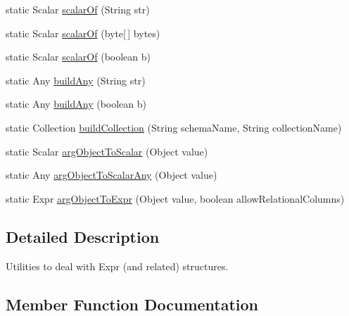 \begin{DoxyCompactItemize}
\item 
static Scalar \mbox{\hyperlink{classcom_1_1mysql_1_1cj_1_1xdevapi_1_1_expr_util_acd10bb6f827786d7e8aa552a1db8c70f}{scalar\+Of}} (String str)
\item 
static Scalar \mbox{\hyperlink{classcom_1_1mysql_1_1cj_1_1xdevapi_1_1_expr_util_a637b00ef4a3f4a3e50d25db59626e747}{scalar\+Of}} (byte\mbox{[}$\,$\mbox{]} bytes)
\item 
static Scalar \mbox{\hyperlink{classcom_1_1mysql_1_1cj_1_1xdevapi_1_1_expr_util_af1782a40f28bd94a760758849f1aeb69}{scalar\+Of}} (boolean b)
\item 
static Any \mbox{\hyperlink{classcom_1_1mysql_1_1cj_1_1xdevapi_1_1_expr_util_a458c1372111de4a2a83a79ba595a89e5}{build\+Any}} (String str)
\item 
static Any \mbox{\hyperlink{classcom_1_1mysql_1_1cj_1_1xdevapi_1_1_expr_util_ae1207346249eeed5d3ae7507a3017889}{build\+Any}} (boolean b)
\item 
static Collection \mbox{\hyperlink{classcom_1_1mysql_1_1cj_1_1xdevapi_1_1_expr_util_a83642d82477cb44df92d81addefb0f2c}{build\+Collection}} (String schema\+Name, String collection\+Name)
\item 
static Scalar \mbox{\hyperlink{classcom_1_1mysql_1_1cj_1_1xdevapi_1_1_expr_util_ac2bbde762a04d17b35a9c89ddebca625}{arg\+Object\+To\+Scalar}} (Object value)
\item 
static Any \mbox{\hyperlink{classcom_1_1mysql_1_1cj_1_1xdevapi_1_1_expr_util_abdbe1af87cb894cea7e682b53bcb1dea}{arg\+Object\+To\+Scalar\+Any}} (Object value)
\item 
static Expr \mbox{\hyperlink{classcom_1_1mysql_1_1cj_1_1xdevapi_1_1_expr_util_a1f63ac5de16e1f9c1bfb6a58fe9fb8c7}{arg\+Object\+To\+Expr}} (Object value, boolean allow\+Relational\+Columns)
\end{DoxyCompactItemize}


\subsection{Detailed Description}
Utilities to deal with Expr (and related) structures. 

\subsection{Member Function Documentation}
\mbox{\label{classcom_1_1mysql_1_1cj_1_1xdevapi_1_1_expr_util_a1f63ac5de16e1f9c1bfb6a58fe9fb8c7}} 
